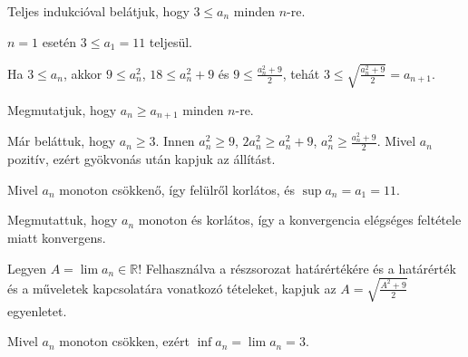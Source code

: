 \documentclass[11pt]{scrartcl}
\begin{document}
Teljes indukcióval belátjuk, hogy $3 \le a_n$ minden $n$-re.

$n = 1$ esetén $3 \le a_1 = 11$ teljesül.

Ha $3 \le a_n$, akkor $9 \le a_n^2$, $18 \le a_n^2 + 9$ és
$9 \le \frac{a_n^2 + 9}{2}$, tehát
\(
3 \le \sqrt{\frac{a_n^2 + 9}{2}} = a_{n + 1}
\).

Megmutatjuk, hogy $a_n \ge a_{n + 1}$ minden $n$-re.

Már beláttuk, hogy $a_n \ge 3$. Innen $a_n^2 \ge 9$, $2a_n^2 \ge a_n^2 + 9$,
$a_n^2 \ge \frac{a_n^2 + 9}{2}$. Mivel $a_n$ pozitív, ezért gyökvonás után
kapjuk az állítást.

Mivel $a_n$ monoton csökkenő, így felülről korlátos, és
$\sup a_n = a_1 = 11$.

Megmutattuk, hogy $a_n$ monoton és korlátos, így a konvergencia elégséges
feltétele miatt konvergens.

Legyen $A = \lim a_n \in \mathbb{R}$! Felhasználva a részsorozat
határértékére és a határérték és a műveletek kapcsolatára vonatkozó
tételeket, kapjuk az \(A = \sqrt{\frac{A^2 + 9}{2}}\) egyenletet.

Mivel $a_n$ monoton csökken, ezért $\inf a_n = \lim a_n = 3$.
\end{document}
